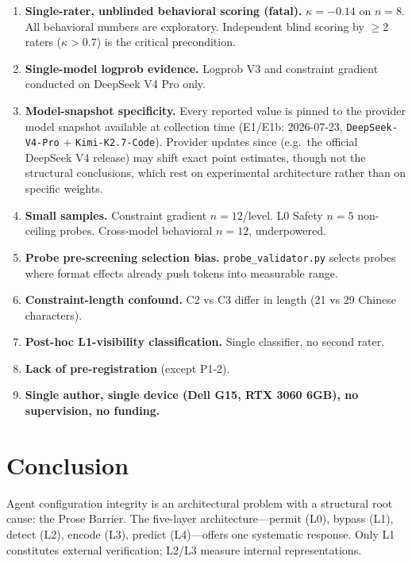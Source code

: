 \documentclass[11pt]{article}
\begin{document}
\begin{enumerate}
\item \textbf{Single-rater, unblinded behavioral scoring (fatal).} $\kappa =
  -0.14$ on $n=8$. All behavioral numbers are exploratory. Independent blind
  scoring by $\geq$2 raters ($\kappa > 0.7$) is the critical precondition.

\item \textbf{Single-model logprob evidence.} Logprob V3 and constraint gradient
  conducted on DeepSeek V4 Pro only.

\item \textbf{Model-snapshot specificity.} Every reported value is pinned to
  the provider model snapshot available at collection time (E1/E1b:
  2026-07-23, \texttt{DeepSeek-V4-Pro} + \texttt{Kimi-K2.7-Code}). Provider
  updates since (e.g.\ the official DeepSeek V4 release) may shift exact point
  estimates, though not the structural conclusions, which rest on experimental
  architecture rather than on specific weights.

\item \textbf{Small samples.} Constraint gradient $n=12$/level. L0 Safety
  $n=5$ non-ceiling probes. Cross-model behavioral $n=12$, underpowered.

\item \textbf{Probe pre-screening selection bias.} \texttt{probe\_validator.py}
  selects probes where format effects already push tokens into measurable range.

\item \textbf{Constraint-length confound.} C2 vs C3 differ in length (21 vs 29
  Chinese characters).

\item \textbf{Post-hoc L1-visibility classification.} Single classifier, no
  second rater.

\item \textbf{Lack of pre-registration} (except P1-2).

\item \textbf{Single author, single device (Dell G15, RTX 3060 6GB), no
  supervision, no funding.}
\end{enumerate}

\section{Conclusion}

Agent configuration integrity is an architectural problem with a structural
root cause: the Prose Barrier. The five-layer architecture---permit (L0),
bypass (L1), detect (L2), encode (L3), predict (L4)---offers one systematic
response. Only L1 constitutes external verification; L2/L3 measure internal
representations.
\end{document}
